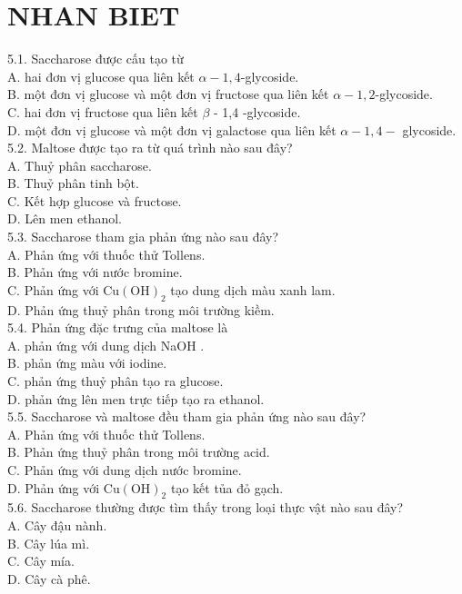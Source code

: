 \documentclass[10pt]{article}
\begin{document}
\section*{NHAN BIET}
5.1. Saccharose được cấu tạo từ\\
A. hai đơn vị glucose qua liên kết $\alpha-1,4$-glycoside.\\
B. một đơn vị glucose và một đơn vị fructose qua liên kết $\alpha-1,2$-glycoside.\\
C. hai đơn vị fructose qua liên kết $\beta$ - 1,4 -glycoside.\\
D. một đơn vị glucose và một đơn vị galactose qua liên kết $\alpha-1,4-$ glycoside.\\
5.2. Maltose được tạo ra từ quá trình nào sau đây?\\
A. Thuỷ phân saccharose.\\
B. Thuỷ phân tinh bột.\\
C. Kết hợp glucose và fructose.\\
D. Lên men ethanol.\\
5.3. Saccharose tham gia phản ứng nào sau đây?\\
A. Phản ứng với thuốc thử Tollens.\\
B. Phản ứng với nước bromine.\\
C. Phản ứng với $\mathrm{Cu}(\mathrm{OH})_{2}$ tạo dung dịch màu xanh lam.\\
D. Phản ứng thuỷ phân trong môi trường kiềm.\\
5.4. Phản ứng đặc trưng của maltose là\\
A. phản ứng với dung dịch NaOH .\\
B. phản ứng màu với iodine.\\
C. phản ứng thuỷ phân tạo ra glucose.\\
D. phản ứng lên men trực tiếp tạo ra ethanol.\\
5.5. Saccharose và maltose đều tham gia phản ứng nào sau đây?\\
A. Phản ứng với thuốc thử Tollens.\\
B. Phản ứng thuỷ phân trong môi trường acid.\\
C. Phản ứng với dung dịch nước bromine.\\
D. Phản ứng với $\mathrm{Cu}(\mathrm{OH})_{2}$ tạo kết tủa đỏ gạch.\\
5.6. Saccharose thường được tìm thấy trong loại thực vật nào sau đây?\\
A. Cây đậu nành.\\
B. Cây lúa mì.\\
C. Cây mía.\\
D. Cây cà phê.
\end{document}
